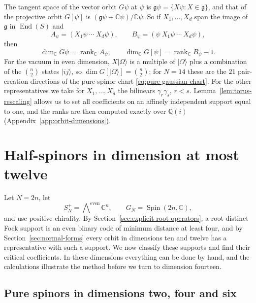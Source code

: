 \documentclass{article}
\theoremstyle{definition}
\theoremstyle{remark}
\newcommand{\vac}{|\Omega\rangle}
\newcommand{\C}{\mathbb C}
\newcommand{\End}{\operatorname{End}}
\newcommand{\Spin}{\operatorname{Spin}}
\newcommand{\ket}[1]{\lvert #1\rangle}
\begin{document}
The tangent space of the vector orbit $G\psi$ at $\psi$ is
$\mathfrak g\psi=\{X\psi:X\in\mathfrak g\}$, and that of the projective orbit
$G[\psi]$ is $(\mathfrak g\psi+\C\psi)/\C\psi$. So if $X_1,\ldots,X_d$ span the
image of $\mathfrak g$ in $\End(S)$ and
\begin{equation}
 A_\psi=(X_1\psi\ \cdots\ X_d\psi),\qquad
 B_\psi=(\psi\ X_1\psi\ \cdots\ X_d\psi),
 \label{eq:orbit-matrices}
\end{equation}
then
\begin{equation}
 \dim_\C G\psi=\operatorname{rank}_\C A_\psi,\qquad
 \dim_\C G[\psi]=\operatorname{rank}_\C B_\psi-1.
 \label{eq:exact-orbit-rank}
\end{equation}
For the vacuum in even dimension, $X\vac$ is a multiple of $\vac$ plus a
combination of the $\binom n2$ states $\ket{ij}$, so $\dim G[\vac]=\binom n2$;
for $N=14$ these are the $21$ pair-creation directions of the pure-spinor chart
\eqref{eq:pure-gaussian-chart}. For the other representatives we take for
$X_1,\ldots,X_d$ the bilinears $\gamma_r\gamma_s$, $r<s$.
Lemma~\ref{lem:torus-rescaling} allows us to set all coefficients on an
affinely independent support equal to one, and the ranks are then computed
exactly over $\mathbb Q(i)$ (Appendix~\ref{app:orbit-dimensions}).



\section{Half-spinors in dimension at most twelve}
\label{sec:even-orbits}

Let $N=2n$, let
\[
 S_N^+=\bigwedge\nolimits^{\mathrm{even}}\C^n,
 \qquad G_N=\Spin(2n,\C),
\]
and use positive chirality. By Section~\ref{sec:explicit-root-operators}, a
root-distinct Fock support is an even binary code of minimum distance at
least four, and by Section~\ref{sec:normal-forms} every orbit in dimensions
ten and twelve has a representative with such a support. We now classify
these supports and find their critical coefficients. In these dimensions
everything can be done by hand, and the calculations illustrate the method before we turn to dimension fourteen.

\subsection{Pure spinors in dimensions two, four and six}
\label{sec:even-pure-cases}
\end{document}
